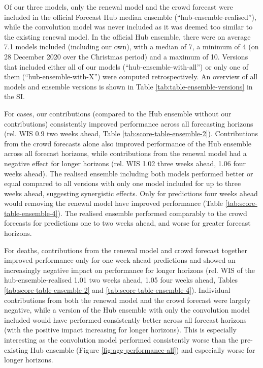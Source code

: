 \documentclass[
]{article}
\begin{document}
Of our three models, only the renewal model and the crowd forecast were included in the official Forecast Hub median ensemble (``hub-ensemble-realised''), while the convolution model was never included as it was deemed too similar to the existing renewal model. In the official Hub ensemble, there were on average 7.1 models included (including our own), with a median of 7, a minimum of 4 (on 28 December 2020 over the Christmas period) and a maximum of 10. Versions that included either all of our models (``hub-ensemble-with-all'') or only one of them (``hub-ensemble-with-X'') were computed retrospectively. An overview of all models and ensemble versions is shown in Table \ref{tab:table-ensemble-versions} in the SI.

For cases, our contributions (compared to the Hub ensemble without our contributions) consistently improved performance across all forecasting horizons (rel. WIS 0.9 two weeks ahead, Table \ref{tab:score-table-ensemble-2}). Contributions from the crowd forecasts alone also improved performance of the Hub ensemble across all forecast horizons, while contributions from the renewal model had a negative effect for longer horizons (rel. WIS 1.02 three weeks ahead, 1.06 four weeks ahead). The realised ensemble including both models performed better or equal compared to all versions with only one model included for up to three weeks ahead, suggesting synergistic effects. Only for predictions four weeks ahead would removing the renewal model have improved performance (Table \ref{tab:score-table-ensemble-4}). The realised ensemble performed comparably to the crowd forecasts for predictions one to two weeks ahead, and worse for greater forecast horizons.

For deaths, contributions from the renewal model and crowd forecast together improved performance only for one week ahead predictions and showed an increasingly negative impact on performance for longer horizons (rel. WIS of the hub-ensemble-realised 1.01 two weeks ahead, 1.05 four weeks ahead, Tables \ref{tab:score-table-ensemble-2} and \ref{tab:score-table-ensemble-4}). Individual contributions from both the renewal model and the crowd forecast were largely negative, while a version of the Hub ensemble with only the convolution model included would have performed consistently better across all forecast horizons (with the positive impact increasing for longer horizons). This is especially interesting as the convolution model performed consistently worse than the pre-existing Hub ensemble (Figure \ref{fig:agg-performance-all}) and especially worse for longer horizons.
\end{document}
